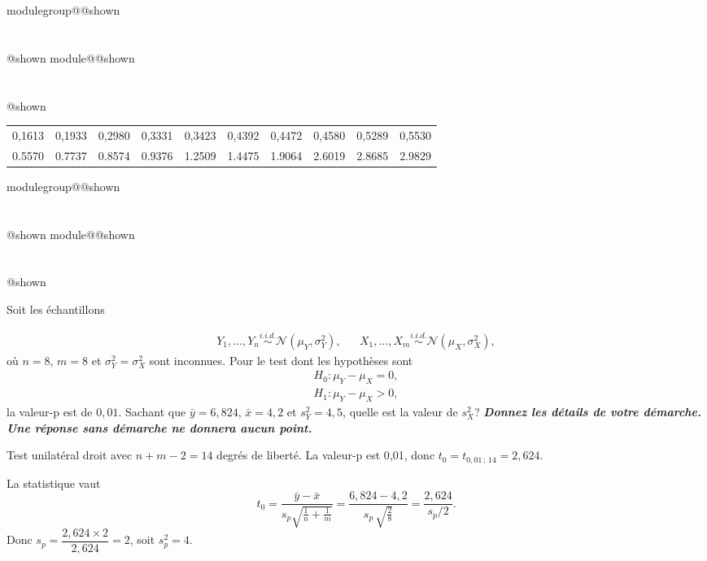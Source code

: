 \documentclass{Evaluation}
\makeatletter
\newcommand{\currentmodulekey}{}
\newcommand{\currentmoduletitle}{}
\newcommand{\currentgroupkey}{}
\newcommand{\currentgrouptitle}{}
\newcommand{\showmoduleifneeded}{%
  \ifx\currentgroupkey\empty\else
    \expandafter\ifx\csname modulegroup@\currentgroupkey @shown\endcsname\relax
      \section*{\currentgrouptitle}%
      \expandafter\gdef\csname modulegroup@\currentgroupkey @shown\endcsname{1}%
    \fi
  \fi
  \expandafter\ifx\csname module@\currentmodulekey @shown\endcsname\relax
    \section*{\currentmoduletitle}%
    \expandafter\gdef\csname module@\currentmodulekey @shown\endcsname{1}%
  \fi
}
\newenvironment{H23}{\showmoduleifneeded}{}
\newenvironment{A23}{\showmoduleifneeded}{}
\makeatother
\begin{document}
\begin{questions}
\begin{H23}
\begin{table}[ht]
\centering
\begin{tabular}{rrrrrrrrrr}
  \hline
0,1613 & 0,1933 & 0,2980 & 0,3331 & 0,3423 & 0,4392 & 0,4472 & 0,4580 & 0,5289 & 0,5530 \\ 
0.5570 & 0.7737 & 0.8574 & 0.9376 & 1.2509 & 1.4475 & 1.9064 & 2.6019 & 2.8685 & 2.9829 \\ 
   \hline
\end{tabular}
\end{table}
\end{H23}

\begin{A23}
\question {} %
Soit les échantillons

\begin{align*}
Y_{1}, \ldots, Y_{n} \overset{i.i.d.}{\sim} \mathcal{N}(\mu_Y, \sigma^2_Y), & & X_{1}, \ldots, X_{m} \overset{i.i.d.}{\sim} \mathcal{N}(\mu_X, \sigma^2_X),
\end{align*}
où $n=8$, $m=8$ et $\sigma^2_Y=\sigma^2_X$ sont inconnues. Pour le test dont les hypothèses sont 
\begin{align*}
    H_0: \mu_Y-\mu_X=0,\\
    H_1: \mu_Y-\mu_X>0,
\end{align*}
 la valeur-p est de $0,01$. Sachant que $\bar{y}=6,824$, $\bar{x}=4,2$ et $s^2_Y=4,5$, quelle est la valeur de $s^2_X$? \textbf{\textit{Donnez les détails de votre démarche. Une réponse sans démarche ne donnera aucun point.}}
\begin{solution}
Test unilatéral droit avec $n+m-2=14$ degrés de liberté. La valeur-p est 0{,}01, donc $t_0 = t_{0{,}01\,;\,14} = 2{,}624$.

La statistique vaut
\[
t_0 = \frac{\bar{y}-\bar{x}}{s_p\sqrt{\frac{1}{n}+\frac{1}{m}}} = \frac{6{,}824-4{,}2}{s_p\,\sqrt{\frac{2}{8}}} = \frac{2{,}624}{s_p / 2}.
\]
Donc $s_p = \dfrac{2{,}624 \times 2}{2{,}624} = 2$, soit $s_p^2 = 4$.


\end{solution}
\end{A23}
\end{questions}
\end{document}
